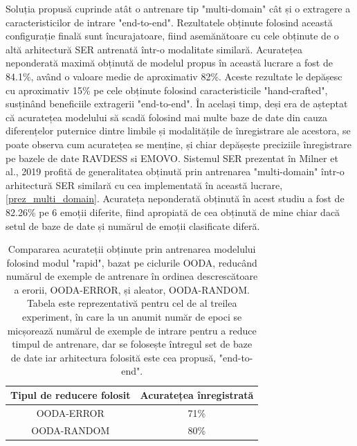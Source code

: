 \documentclass[a4paper,12pt]{book}
\begin{document}
		 \par
		 Soluția propusă cuprinde atât o antrenare tip "multi-domain" cât și o extragere a caracteristicilor de intrare "end-to-end". Rezultatele obținute folosind această configurație finală sunt încurajatoare, fiind asemănătoare cu cele obținute de o altă arhitectură SER antrenată într-o modalitate similară. Acuratețea neponderată maximă obținută de modelul propus în această lucrare a fost de 84.1\%, având o valoare medie de aproximativ 82\%. Aceste rezultate le depășesc cu aproximativ 15\% pe cele obținute folosind caracteristicile "hand-crafted", susținând beneficiile extragerii "end-to-end". În același timp, deși era de așteptat că acuratețea modelului să scadă folosind mai multe baze de date din cauza diferențelor  puternice dintre limbile și modalitățile de înregistrare ale acestora, se poate observa cum acuratețea se menține, și chiar depășește preciziile înregistrare pe bazele de date RAVDESS si EMOVO. Sistemul SER prezentat în Milner et al., 2019 \cite{multi-domain} profită de generalitatea obținută prin antrenarea "multi-domain" într-o arhitectură SER similară cu cea implementată în această lucrare, \ref{prez_multi_domain}. Acurateța neponderată obținută în acest studiu a fost de 82.26\% pe 6 emoții diferite, fiind apropiată de cea obținută de mine chiar dacă setul de baze de date și numărul de emoții clasificate diferă. \par		 
		 
		 \bgroup
			\def\arraystretch{1.2}
			\begin{table}[t] \centering
				\caption{Compararea acurateții obținute prin antrenarea modelului folosind modul "rapid", bazat pe ciclurile OODA, reducând numărul de exemple de antrenare în ordinea descrescătoare a erorii, OODA-ERROR, și aleator, OODA-RANDOM. Tabela este reprezentativă pentru cel de al treilea experiment, în care la un anumit număr de epoci se micșorează numărul de exemple de intrare pentru a reduce timpul de antrenare, dar se folosește întregul set de baze de date iar arhitectura folosită este cea propusă, "end-to-end".
				}
		 	\begin{tabular}{cc}
		 		\hline
		 		Tipul de reducere folosit & Acuratețea înregistrată	\\ \hline
		 		OODA-ERROR                & 71\%                    \\
		 		OODA-RANDOM               & 80\%                    \\ \hline
		 	\end{tabular}
		 	\label{tab:ooda-table}
		 \end{table}
	 	 \egroup
	
\end{document}
